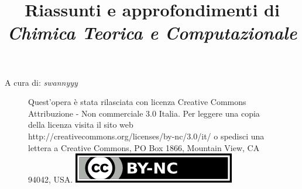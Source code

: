 \documentclass[oneside]{amsbook}
\numberwithin{section}{chapter}
\numberwithin{equation}{section}
\numberwithin{figure}{section}
\begin{document}
\begin{titlepage}
\title{Riassunti e approfondimenti di\\ \textit{\Huge Chimica Teorica e Computazionale}}

\end{titlepage}
\maketitle

 A cura di: \textit{\Large swannyyy}
\begin{figure}
{\small Quest'opera è stata rilasciata con licenza Creative Commons Attribuzione - Non commerciale 3.0 Italia. Per leggere una copia della licenza visita il sito web http://creativecommons.org/licenses/by-nc/3.0/it/ o spedisci una lettera a Creative Commons, PO Box 1866, Mountain View, CA 94042, USA.}
\includegraphics[scale=1.0]{licenza}
\end{figure}

\tableofcontents{}
\end{document}

